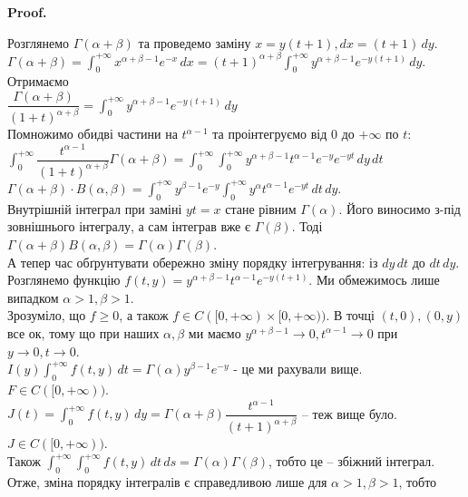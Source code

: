 \documentclass[a4paper, 10pt]{article}
\makeatletter
\def\huge{\displaystyle}
\theoremstyle{theoremdd}
\theoremstyle{theoremdd}
\theoremstyle{theoremdd}
\theoremstyle{theoremdd}
\theoremstyle{theoremdd}
\theoremstyle{theoremdd}
\theoremstyle{theoremdd}
\theoremstyle{theoremdd}
\theoremstyle{theoremdd}
\renewenvironment{proof}[1][Proof.\\]{\par
\pushQED{\hfill \qed}%
\normalfont \topsep6\p@\@plus6\p@\relax
\trivlist
\item\relax
{\bfseries
#1\@addpunct{.}}\hspace\labelsep\ignorespaces
}{%
\popQED\endtrivlist\@endpefalse
}
\makeatother
\begin{document}
\iffalse
\begin{proof}
Розглянемо $\Gamma(\alpha+\beta)$ та проведемо заміну $x = y(t+1), dx = (t+1)\,dy$.\\
$\Gamma(\alpha+\beta) = \huge \int_0^{+\infty} x^{\alpha+\beta-1} e^{-x}\,dx = (t+1)^{\alpha+\beta} \int_0^{+\infty} y^{\alpha+\beta-1}e^{-y(t+1)}\,dy$.\\
Отримаємо\\
$\dfrac{\Gamma(\alpha+\beta)}{(1+t)^{\alpha+\beta}} = \huge \int_0^{+\infty} y^{\alpha+\beta-1}e^{-y(t+1)}\,dy$\\
Помножимо обидві частини на $t^{\alpha-1}$ та проінтегруємо від $0$ до $+\infty$ по $t$:\\
$\huge \int_0^{+\infty} \dfrac{t^{\alpha-1}}{(1+t)^{\alpha+\beta}} \Gamma(\alpha+\beta) = \huge \int_0^{+\infty} \int_0^{+\infty} y^{\alpha+\beta-1} t^{\alpha-1}e^{-y}e^{-yt}\,dy\,dt$\\
$\Gamma(\alpha+\beta) \cdot B(\alpha,\beta) = \huge \int_0^{+\infty} y^{\beta-1} e^{-y} \int_0^{+\infty} y^{\alpha} t^{\alpha-1}e^{-yt}\,dt \,dy$.\\
Внутрішній інтеграл при заміні $yt = x$ стане рівним $\Gamma(\alpha)$. Його виносимо з-під зовнішнього інтегралу, а сам інтеграв вже є $\Gamma(\beta)$. Тоді\\
$\Gamma(\alpha+\beta) B(\alpha, \beta) = \Gamma(\alpha) \Gamma(\beta)$.
\bigskip \\
А тепер час обґрунтувати обережно зміну порядку інтегрування: із $dy \,dt$ до $dt\,dy$.\\
Розглянемо функцію $f(t,y) = y^{\alpha+\beta-1} t^{\alpha-1}e^{-y(t+1)}$. Ми обмежимось лише випадком $\alpha >1, \beta > 1$.\\
Зрозуміло, що $f \geq 0$, а також $f \in C([0,+\infty) \times [0,+\infty))$. В точці $(t,0),(0,y)$ все ок, тому що при наших $\alpha,\beta$ ми маємо $y^{\alpha+\beta-1} \to 0, t^{\alpha-1} \to 0$ при $y \to 0, t \to 0$.\\
$I(y) \huge\int_0^{+\infty} f(t,y)\,dt = \Gamma(\alpha) y^{\beta-1}e^{-y}$ - це ми рахували вище. $F \in C([0,+\infty))$.\\
$J(t) = \huge\int_0^{+\infty} f(t,y)\,dy = \Gamma(\alpha+\beta) \dfrac{t^{\alpha-1}}{(t+1)^{\alpha+\beta}}$ -- теж вище було. $J \in C([0,+\infty))$.\\
Також $\huge\int_0^{+\infty} \huge\int_0^{+\infty} f(t,y)\,dt\,ds = \Gamma(\alpha) \Gamma(\beta)$, тобто це -- збіжний інтеграл.\\
Отже, зміна порядку інтегралів є справедливою лише для $\alpha >1, \beta > 1$, тобто\\

\end{proof}
\end{document}

